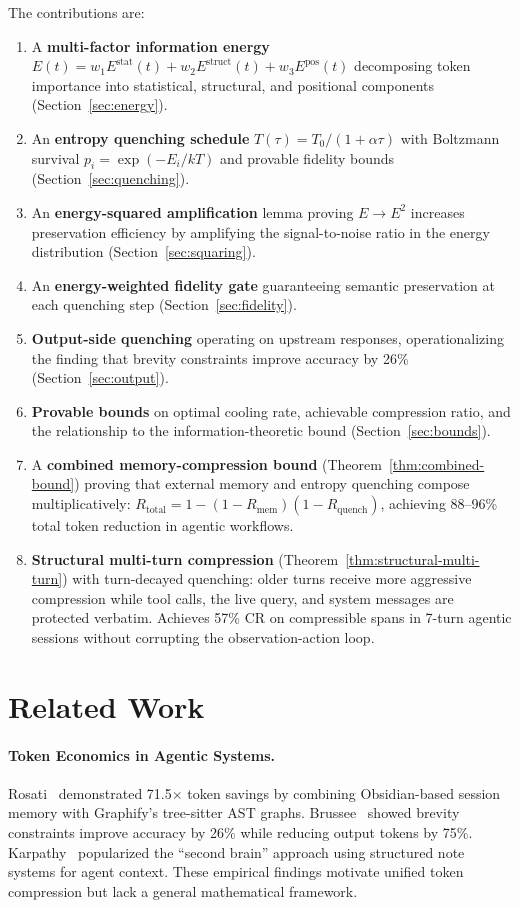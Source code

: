 \documentclass[11pt]{article}
\theoremstyle{remark}
\newcommand{\Es}{E^{\text{stat}}}
\newcommand{\Er}{E^{\text{struct}}}
\newcommand{\Ep}{E^{\text{pos}}}
\begin{document}
The contributions are:
\begin{enumerate}[label=(\arabic*)]
    \item A \textbf{multi-factor information energy} $E(t) = w_1\Es(t) + w_2\Er(t) + w_3\Ep(t)$ decomposing token importance into statistical, structural, and positional components (Section~\ref{sec:energy}).
    \item An \textbf{entropy quenching schedule} $T(\tau) = T_0/(1+\alpha\tau)$ with Boltzmann survival $p_i = \exp(-E_i/kT)$ and provable fidelity bounds (Section~\ref{sec:quenching}).
    \item An \textbf{energy-squared amplification} lemma proving $E \to E^2$ increases preservation efficiency by amplifying the signal-to-noise ratio in the energy distribution (Section~\ref{sec:squaring}).
    \item An \textbf{energy-weighted fidelity gate} guaranteeing semantic preservation at each quenching step (Section~\ref{sec:fidelity}).
    \item \textbf{Output-side quenching} operating on upstream responses, operationalizing the finding that brevity constraints improve accuracy by 26\%~\cite{caveman2026} (Section~\ref{sec:output}).
    \item \textbf{Provable bounds} on optimal cooling rate, achievable compression ratio, and the relationship to the information-theoretic bound (Section~\ref{sec:bounds}).
    \item A \textbf{combined memory-compression bound} (Theorem~\ref{thm:combined-bound}) proving that external memory and entropy quenching compose multiplicatively: $R_{\text{total}} = 1 - (1-R_{\text{mem}})(1-R_{\text{quench}})$, achieving 88--96\% total token reduction in agentic workflows.
    \item \textbf{Structural multi-turn compression} (Theorem~\ref{thm:structural-multi-turn}) with turn-decayed quenching: older turns receive more aggressive compression while tool calls, the live query, and system messages are protected verbatim. Achieves 57\% CR on compressible spans in 7-turn agentic sessions without corrupting the observation-action loop.
\end{enumerate}

\section{Related Work}

\paragraph{Token Economics in Agentic Systems.}
Rosati~\cite{rosati2026} demonstrated 71.5$\times$ token savings by combining
Obsidian-based session memory with Graphify's tree-sitter AST graphs.
Brussee~\cite{caveman2026,caveman_plugin} showed brevity constraints improve
accuracy by 26\% while reducing output tokens by 75\%. Karpathy~\cite{karpathy2026}
popularized the ``second brain'' approach using structured note systems for
agent context. These empirical findings motivate unified token compression
but lack a general mathematical framework.
\end{document}
